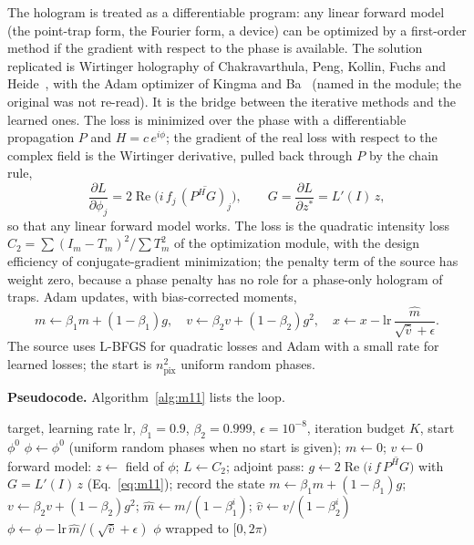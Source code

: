 The hologram is treated as a differentiable program: any linear forward model (the point-trap form, the Fourier form, a device) can be optimized by a first-order method if the gradient with respect to the phase is available. The solution replicated is Wirtinger holography of Chakravarthula, Peng, Kollin, Fuchs and Heide~\cite{chakra}, with the Adam optimizer of Kingma and Ba~\cite{kingma} (named in the module; the original was not re-read). It is the bridge between the iterative methods and the learned ones. The loss is minimized over the phase with a differentiable propagation $P$ and $H=c\,e^{i\phi}$; the gradient of the real loss with respect to the complex field is the Wirtinger derivative, pulled back through $P$ by the chain rule,
\begin{equation}
\frac{\partial L}{\partial\phi_j}=2\operatorname{Re}\!\big(i\,f_j\,\overline{(P^{H}G)_j}\big),\qquad G=\frac{\partial L}{\partial z^*}=L'(I)\,z,
\label{eq:m11}
\end{equation}
so that any linear forward model works. The loss is the quadratic intensity loss $C_2=\sum(I_m-T_m)^2/\sum T_m^2$ of the optimization module, with the design efficiency of conjugate-gradient minimization; the penalty term of the source has weight zero, because a phase penalty has no role for a phase-only hologram of traps. Adam updates, with bias-corrected moments,
\begin{equation}
m\leftarrow\beta_1m+(1-\beta_1)g,\quad v\leftarrow\beta_2v+(1-\beta_2)g^2,\quad x\leftarrow x-\mathrm{lr}\,\frac{\hat m}{\sqrt{\hat v}+\epsilon}.
\label{eq:m11-adam}
\end{equation}
The source uses L-BFGS for quadratic losses and Adam with a small rate for learned losses; the start is $n_{\mathrm{pix}}^2$ uniform random phases.

\textbf{Pseudocode.} Algorithm~\ref{alg:m11} lists the loop.

\begin{algorithm}[t]
\caption{Wirtinger gradient descent with Adam on the quadratic intensity loss; the history records the state before each step, so the cost may rise.}
\label{alg:m11}
\begin{algorithmic}[1]
\Require target, learning rate $\mathrm{lr}$, $\beta_1=0.9$, $\beta_2=0.999$, $\epsilon=10^{-8}$, iteration budget $K$, start $\phi^0$
\State $\phi\gets\phi^0$ (uniform random phases when no start is given); $m\gets0$; $v\gets0$
  \State forward model: $z\gets$ field of $\phi$; $L\gets C_2$; adjoint pass: $g\gets2\operatorname{Re}\big(i\,f\,\overline{P^HG}\big)$ with $G=L'(I)\,z$ (Eq.~\eqref{eq:m11}); record the state
  \State $m\gets\beta_1m+(1-\beta_1)g$; $v\gets\beta_2v+(1-\beta_2)g^2$; $\hat m\gets m/(1-\beta_1^i)$; $\hat v\gets v/(1-\beta_2^i)$
  \State $\phi\gets\phi-\mathrm{lr}\,\hat m/(\sqrt{\hat v}+\epsilon)$
\EndFor
\State \Return $\phi$ wrapped to $[0,2\pi)$
\end{algorithmic}
\end{algorithm}

